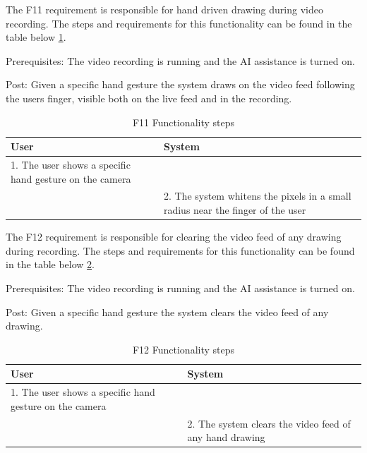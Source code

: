 \par The F11 requirement is responsible for hand driven drawing during video recording. The steps and requirements for this functionality can be found in the table below \ref{F11Table}.
\par Prerequisites: The video recording is running and the AI assistance is turned on.
\par Post: Given a specific hand gesture the system draws on the video feed following the users finger, visible both on the live feed and in the recording.

\begin{table}[htbp]
\begin{center}
\begin{tabular}
{|p{180pt}|p{180pt}|}
\hline
 User & System\\
\hline 
\hline 1. The user shows a specific hand gesture on the camera &  \\
\hline  & 2. The system whitens the pixels in a small radius near the finger of the user \\
\hline
\end{tabular}
\end{center}
\caption{F11 Functionality steps}
\label{F11Table}
\end{table}

\par The F12 requirement is responsible for clearing the video feed of any drawing during recording. The steps and requirements for this functionality can be found in the table below \ref{F12Table}.
\par Prerequisites: The video recording is running and the AI assistance is turned on.
\par Post: Given a specific hand gesture the system clears the video feed of any drawing.

\begin{table}[htbp]
\begin{center}
\begin{tabular}
{|p{180pt}|p{180pt}|}
\hline
 User & System\\
\hline 
\hline 1. The user shows a specific hand gesture on the camera &  \\
\hline  & 2. The system clears the video feed of any hand drawing \\
\hline
\end{tabular}
\end{center}
\caption{F12 Functionality steps}
\label{F12Table}
\end{table}

